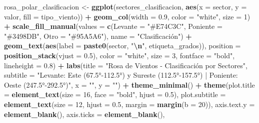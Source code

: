 \documentclass[
]{article}
\newenvironment{Shaded}{\begin{snugshade}}{\end{snugshade}}
\newcommand{\AttributeTok}[1]{\textcolor[rgb]{0.13,0.29,0.53}{#1}}
\newcommand{\DecValTok}[1]{\textcolor[rgb]{0.00,0.00,0.81}{#1}}
\newcommand{\FloatTok}[1]{\textcolor[rgb]{0.00,0.00,0.81}{#1}}
\newcommand{\FunctionTok}[1]{\textcolor[rgb]{0.13,0.29,0.53}{\textbf{#1}}}
\newcommand{\NormalTok}[1]{#1}
\newcommand{\OtherTok}[1]{\textcolor[rgb]{0.56,0.35,0.01}{#1}}
\newcommand{\SpecialCharTok}[1]{\textcolor[rgb]{0.81,0.36,0.00}{\textbf{#1}}}
\newcommand{\StringTok}[1]{\textcolor[rgb]{0.31,0.60,0.02}{#1}}
\begin{document}
\begin{Shaded}
\begin{Highlighting}[]
\NormalTok{rosa\_polar\_clasificacion }\OtherTok{\textless{}{-}} \FunctionTok{ggplot}\NormalTok{(sectores\_clasificacion,}
    \FunctionTok{aes}\NormalTok{(}\AttributeTok{x =}\NormalTok{ sector, }\AttributeTok{y =}\NormalTok{ valor, }\AttributeTok{fill =}\NormalTok{ tipo\_viento)) }\SpecialCharTok{+}
    \FunctionTok{geom\_col}\NormalTok{(}\AttributeTok{width =} \FloatTok{0.9}\NormalTok{, }\AttributeTok{color =} \StringTok{"white"}\NormalTok{,}
        \AttributeTok{size =} \DecValTok{1}\NormalTok{) }\SpecialCharTok{+} \FunctionTok{scale\_fill\_manual}\NormalTok{(}\AttributeTok{values =} \FunctionTok{c}\NormalTok{(}\AttributeTok{Levante =} \StringTok{"\#E74C3C"}\NormalTok{,}
    \AttributeTok{Poniente =} \StringTok{"\#3498DB"}\NormalTok{, }\AttributeTok{Otro =} \StringTok{"\#95A5A6"}\NormalTok{),}
    \AttributeTok{name =} \StringTok{"Clasificación"}\NormalTok{) }\SpecialCharTok{+} \FunctionTok{geom\_text}\NormalTok{(}\FunctionTok{aes}\NormalTok{(}\AttributeTok{label =} \FunctionTok{paste0}\NormalTok{(sector,}
    \StringTok{"}\SpecialCharTok{\textbackslash{}n}\StringTok{"}\NormalTok{, etiqueta\_grados)), }\AttributeTok{position =} \FunctionTok{position\_stack}\NormalTok{(}\AttributeTok{vjust =} \FloatTok{0.5}\NormalTok{),}
    \AttributeTok{color =} \StringTok{"white"}\NormalTok{, }\AttributeTok{size =} \DecValTok{3}\NormalTok{, }\AttributeTok{fontface =} \StringTok{"bold"}\NormalTok{,}
    \AttributeTok{lineheight =} \FloatTok{0.8}\NormalTok{) }\SpecialCharTok{+} \FunctionTok{labs}\NormalTok{(}\AttributeTok{title =} \StringTok{"Rosa de Vientos {-} Clasificación por Sectores"}\NormalTok{,}
    \AttributeTok{subtitle =} \StringTok{"Levante: Este (67.5°{-}112.5°) y Sureste (112.5°{-}157.5°) | Poniente: Oeste (247.5°{-}292.5°)"}\NormalTok{,}
    \AttributeTok{x =} \StringTok{""}\NormalTok{, }\AttributeTok{y =} \StringTok{""}\NormalTok{) }\SpecialCharTok{+} \FunctionTok{theme\_minimal}\NormalTok{() }\SpecialCharTok{+} \FunctionTok{theme}\NormalTok{(}\AttributeTok{plot.title =} \FunctionTok{element\_text}\NormalTok{(}\AttributeTok{size =} \DecValTok{16}\NormalTok{,}
    \AttributeTok{face =} \StringTok{"bold"}\NormalTok{, }\AttributeTok{hjust =} \FloatTok{0.5}\NormalTok{), }\AttributeTok{plot.subtitle =} \FunctionTok{element\_text}\NormalTok{(}\AttributeTok{size =} \DecValTok{12}\NormalTok{,}
    \AttributeTok{hjust =} \FloatTok{0.5}\NormalTok{, }\AttributeTok{margin =} \FunctionTok{margin}\NormalTok{(}\AttributeTok{b =} \DecValTok{20}\NormalTok{)),}
    \AttributeTok{axis.text.y =} \FunctionTok{element\_blank}\NormalTok{(), }\AttributeTok{axis.ticks =} \FunctionTok{element\_blank}\NormalTok{(),}

\end{Highlighting}
\end{Shaded}
\end{document}

